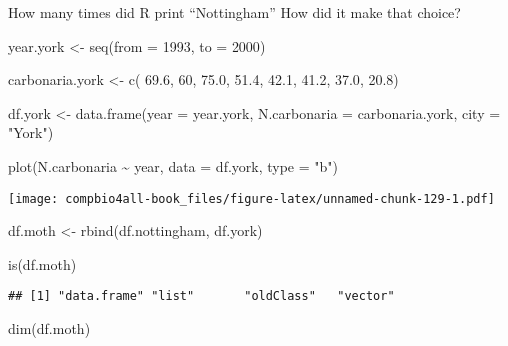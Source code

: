 \documentclass[
]{book}
\newenvironment{Shaded}{\begin{snugshade}}{\end{snugshade}}
\newcommand{\AttributeTok}[1]{\textcolor[rgb]{0.77,0.63,0.00}{#1}}
\newcommand{\DecValTok}[1]{\textcolor[rgb]{0.00,0.00,0.81}{#1}}
\newcommand{\FloatTok}[1]{\textcolor[rgb]{0.00,0.00,0.81}{#1}}
\newcommand{\FunctionTok}[1]{\textcolor[rgb]{0.00,0.00,0.00}{#1}}
\newcommand{\NormalTok}[1]{#1}
\newcommand{\OtherTok}[1]{\textcolor[rgb]{0.56,0.35,0.01}{#1}}
\newcommand{\SpecialCharTok}[1]{\textcolor[rgb]{0.00,0.00,0.00}{#1}}
\newcommand{\StringTok}[1]{\textcolor[rgb]{0.31,0.60,0.02}{#1}}
\begin{document}
How many times did R print ``Nottingham'' How did it make that choice?

\begin{Shaded}
\begin{Highlighting}[]
\NormalTok{year.york }\OtherTok{\textless{}{-}} \FunctionTok{seq}\NormalTok{(}\AttributeTok{from =} \DecValTok{1993}\NormalTok{,}
                 \AttributeTok{to =} \DecValTok{2000}\NormalTok{)}

\NormalTok{carbonaria.york }\OtherTok{\textless{}{-}} \FunctionTok{c}\NormalTok{( }\FloatTok{69.6}\NormalTok{, }\DecValTok{60}\NormalTok{, }\FloatTok{75.0}\NormalTok{, }\FloatTok{51.4}\NormalTok{, }\FloatTok{42.1}\NormalTok{,}
                      \FloatTok{41.2}\NormalTok{, }\FloatTok{37.0}\NormalTok{, }\FloatTok{20.8}\NormalTok{)}

\NormalTok{df.york }\OtherTok{\textless{}{-}} \FunctionTok{data.frame}\NormalTok{(}\AttributeTok{year =}\NormalTok{ year.york,}
                      \AttributeTok{N.carbonaria =}\NormalTok{ carbonaria.york,}
                      \AttributeTok{city =} \StringTok{"York"}\NormalTok{)}

\FunctionTok{plot}\NormalTok{(N.carbonaria }\SpecialCharTok{\textasciitilde{}}\NormalTok{ year, }\AttributeTok{data =}\NormalTok{  df.york, }\AttributeTok{type =} \StringTok{"b"}\NormalTok{)}
\end{Highlighting}
\end{Shaded}

\texttt{[image: compbio4all-book\_files/figure-latex/unnamed-chunk-129-1.pdf]}

\begin{Shaded}
\begin{Highlighting}[]
\NormalTok{df.moth }\OtherTok{\textless{}{-}} \FunctionTok{rbind}\NormalTok{(df.nottingham,}
\NormalTok{                 df.york)}
\end{Highlighting}
\end{Shaded}

\begin{Shaded}
\begin{Highlighting}[]
\FunctionTok{is}\NormalTok{(df.moth)}
\end{Highlighting}
\end{Shaded}

\begin{verbatim}
## [1] "data.frame" "list"       "oldClass"   "vector"
\end{verbatim}

\begin{Shaded}
\begin{Highlighting}[]
\FunctionTok{dim}\NormalTok{(df.moth)}
\end{Highlighting}
\end{Shaded}
\end{document}
